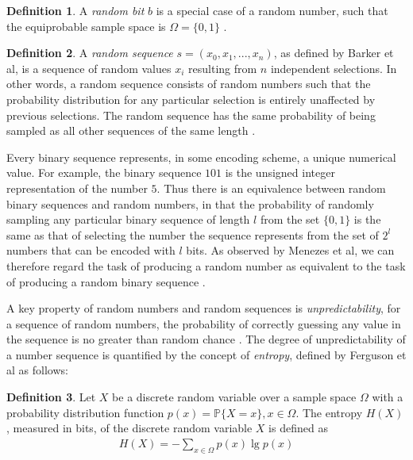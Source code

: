 \documentclass[12pt, titlepage]{report}
\theoremstyle{definition}
\newtheorem{definition}{Definition}
\begin{document}
\begin{definition}
A \emph{random bit} $b$ is a special case of a random number, such that the equiprobable sample space is $\Omega = \{0, 1\}$ \cite[s. 1.1.1]{rukhin2001statistical}.
\end{definition}

\begin{definition}
A \emph{random sequence} $s = (x_0, x_1, ..., x_n)$, as defined by Barker et al, is a sequence of random values $x_i$ resulting from $n$ independent selections. In other words, a random sequence consists of random numbers such that the probability distribution for any particular selection is entirely unaffected by previous selections. The random sequence has the same probability of being sampled as all other sequences of the same length \cite[p. 7]{barker2007recommendation} \cite[s. 1.1.1]{rukhin2001statistical}.
\end{definition}

Every binary sequence represents, in some encoding scheme, a unique numerical value. For example, the binary sequence $101$ is the unsigned integer representation of the number $5$. Thus there is an equivalence between random binary sequences and random numbers, in that the probability of randomly sampling any particular binary sequence of length $l$ from the set $\{0, 1\}$ is the same as that of selecting the number the sequence represents from the set of $2^l$ numbers that can be encoded with $l$ bits. As observed by Menezes et al, we can therefore regard the task of producing a random number as equivalent to the task of producing a random binary sequence \cite[p. 170]{menezes1996handbook}.

A key property of random numbers and random sequences is \emph{unpredictability}, for a sequence of random numbers, the probability of correctly guessing any value in the sequence is no greater than random chance \cite[p. 7]{barker2007recommendation}. The degree of unpredictability of a number sequence is quantified by the concept of \emph{entropy}, defined by Ferguson et al \cite[p. 12-13]{cover2012elements} as follows:

\begin{definition}
Let $X$ be a discrete random variable over a sample space $\Omega$ with a probability distribution function $p(x)=\mathbb{P}\{X=x\}, x\in\Omega$.  The entropy $H(X)$, measured in bits, of the discrete random variable $X$ is defined as
\begin{gather}\label{eq:entropy}
H(X) = -\sum_{x\in\Omega} p(x) \lg p(x)
\end{gather}
\end{definition}
\end{document}
